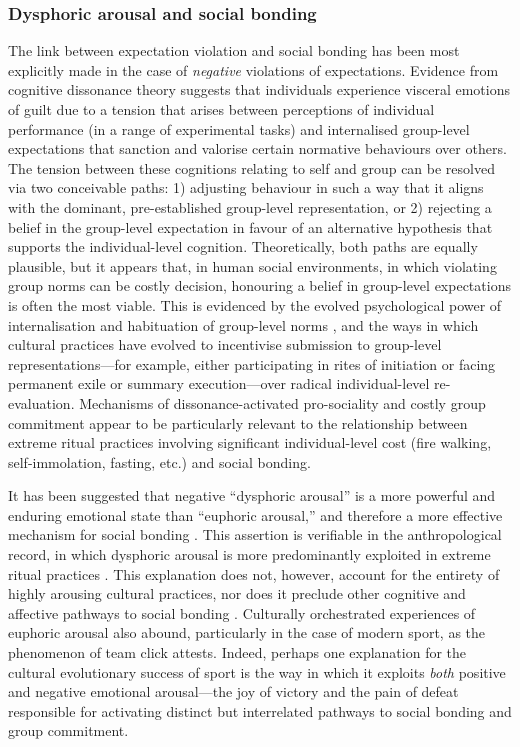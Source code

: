 \begin{CJK}{UTF8}{gbsn}
{\subsubsection{Dysphoric arousal and social bonding}
The link between expectation violation and social bonding has been most explicitly made in the case of \textit{negative} violations of expectations.  Evidence from cognitive dissonance theory \citep{Festinger1957} suggests that individuals experience visceral emotions of guilt due to a tension that arises between perceptions of individual performance (in a range of experimental tasks) and internalised group-level expectations that sanction and valorise certain normative behaviours over others\citep{Kenworthy2011,Stone2001}.  The tension between these cognitions relating to self and group can be resolved via two conceivable paths: 1) adjusting behaviour in such a way that it aligns with the dominant, pre-established group-level representation, or 2) rejecting a belief in the group-level expectation in favour of an alternative hypothesis that supports the individual-level cognition.
Theoretically, both paths are equally plausible, but it appears that, in human social environments, in which violating group norms can be costly decision, honouring a belief in group-level expectations is often the most viable.  This is evidenced by the evolved psychological power of internalisation and habituation of group-level norms \citep{Chudek2011}, and the ways in which cultural practices have evolved to incentivise submission to group-level representations---for example, either participating in rites of initiation or facing permanent exile or summary execution\citep[cf.][18]{Whitehouse2014}---over radical individual-level re-evaluation\citep{Sosis2003}.
Mechanisms of dissonance-activated pro-sociality and costly group commitment appear to be particularly relevant to the relationship between extreme ritual practices involving significant individual-level cost (fire walking, self-immolation, fasting, etc.) and social bonding\citep{Sosis2003,Xygalatas2013,Bastian2014,Fischer2014,Whitehouse2014}.

It has been suggested that negative ``dysphoric arousal'' is a more powerful and enduring emotional state than ``euphoric arousal,'' and therefore a more effective mechanism for social bonding \citep{Whitehouse1996,Whitehouse2004}.  This assertion is verifiable in the anthropological record, in which dysphoric arousal is more predominantly exploited in extreme ritual practices \citep{Atkinson2011,Whitehouse2014}. This explanation does not, however, account for the entirety of highly arousing cultural practices, nor does it preclude other cognitive and affective pathways to social bonding \citep{Downey2014,Xygalatas2014,Fischer2014,Fischer2014a}.  Culturally orchestrated experiences of euphoric arousal also abound, particularly in the case of modern sport, as the phenomenon of team click attests. Indeed, perhaps one explanation for the cultural evolutionary success of sport is the way in which it exploits \textit{both} positive and negative emotional arousal---the joy of victory and the pain of defeat responsible for activating distinct but interrelated pathways to social bonding and group commitment.


}
\end{CJK}
